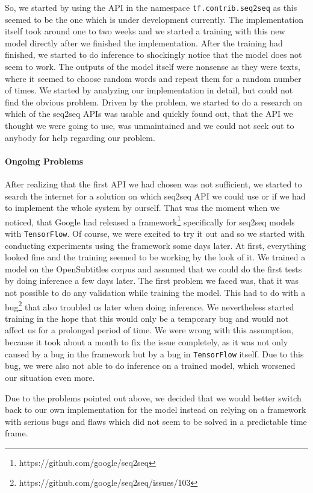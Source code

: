 So, we started by using the API in the namespace \texttt{tf.contrib.seq2seq} as this seemed to be the one which is under development currently. The implementation itself took around one to two weeks and we started a training with this new model directly after we finished the implementation. After the training had finished, we started to do inference to shockingly notice that the model does not seem to work. The outputs of the model itself were nonsense as they were texts, where it seemed to choose random words and repeat them for a random number of times. We started by analyzing our implementation in detail, but could not find the obvious problem. Driven by the problem, we started to do a research on which of the seq2seq APIs was usable and quickly found out, that the API we thought we were going to use, was unmaintained and we could not seek out to anybody for help regarding our problem.

\paragraph{Ongoing Problems} After realizing that the first API we had chosen was not sufficient, we started to search the internet for a solution on which seq2seq API we could use or if we had to implement the whole system by ourself. That was the moment when we noticed, that Google had released a framework\footnote{https://github.com/google/seq2seq} specifically for seq2seq models with \texttt{TensorFlow}. Of course, we were excited to try it out and so we started with conducting experiments using the framework some days later. At first, everything looked fine and the training seemed to be working by the look of it. We trained a model on the OpenSubtitles corpus and assumed that we could do the first tests by doing inference a few days later. The first problem we faced was, that it was not possible to do any validation while training the model. This had to do with a bug\footnote{https://github.com/google/seq2seq/issues/103} that also troubled us later when doing inference. We nevertheless started training in the hope that this would only be a temporary bug and would not affect us for a prolonged period of time. We were wrong with this assumption, because it took about a month to fix the issue completely, as it was not only caused by a bug in the framework but by a bug in \texttt{TensorFlow} itself. Due to this bug, we were also not able to do inference on a trained model, which worsened our situation even more.

Due to the problems pointed out above, we decided that we would better switch back to our own implementation for the model instead on relying on a framework with serious bugs and flaws which did not seem to be solved in a predictable time frame.

